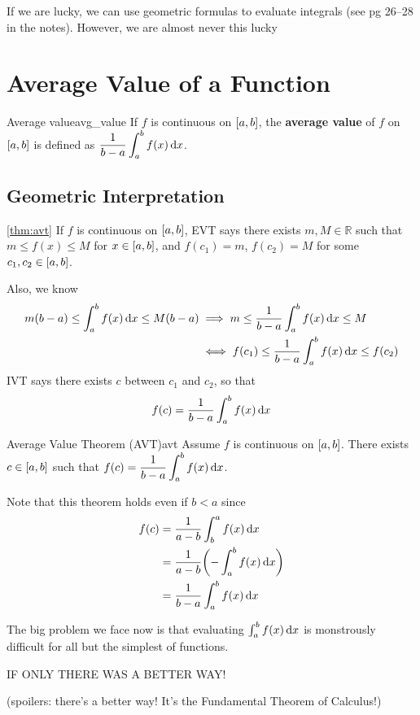 \begin{Remark}{}{}
    If we are lucky, we can use geometric formulas to evaluate integrals
    (see pg 26--28 in the notes). However, we are almost never this lucky\textellipsis{}
\end{Remark}

\section{Average Value of a Function}

\begin{Definition}{Average value}{avg_value}
    If $ f $ is continuous on $ \interval{a}{b} $, the \textbf{average value} of $ f $
    on $ \interval{a}{b} $ is defined as
    $ \displaystyle \frac{1}{b-a} \int_{a}^{b} f(x)\odif{x} $.
\end{Definition}

\subsection*{Geometric Interpretation}
\begin{Proof}{\ref{thm:avt}}{}
    If $ f $ is continuous on $ \interval{a}{b} $, EVT says there exists $ m,M\in\mathbb{R} $ such that
    $ \displaystyle m\le f(x) \le M $
    for $ x\in\interval{a}{b} $, and $ f(c_1)=m $, $ f(c_2)=M $ for some $ c_1,c_2\in\interval{a}{b} $.

    Also, we know
    \begin{align*}
        m(b-a)\le \int_{a}^{b} f(x)\odif{x} \le M(b-a)
         & \implies m\le \frac{1}{b-a} \int_{a}^{b} f(x)\odif{x} \le M       \\
         & \iff f(c_1)\le \frac{1}{b-a} \int_{a}^{b} f(x)\odif{x} \le f(c_2) \\
    \end{align*}
    IVT says there exists $ c $ between $ c_1 $ and $ c_2 $, so that
    \[ f(c)=\frac{1}{b-a} \int_{a}^{b} f(x)\odif{x} \]
\end{Proof}

\begin{Theorem}{Average Value Theorem (AVT)}{avt}
    Assume $ f $ is continuous on $ \interval{a}{b} $.
    There exists $ c\in\interval{a}{b} $ such that
    $ \displaystyle f(c)=\frac{1}{b-a} \int_{a}^{b} f(x)\odif{x} $.
\end{Theorem}

\begin{Remark}{}{}
    Note that this theorem holds even if $ b<a $ since
    \begin{align*}
        f(c) & =\frac{1}{a-b} \int_{b}^{a} f(x)\odif{x}               \\
             & =\frac{1}{a-b}\biggl(-\int_{a}^{b} f(x)\odif{x}\biggr) \\
             & =\frac{1}{b-a} \int_{a}^{b} f(x)\odif{x}
    \end{align*}
\end{Remark}

The big problem we face now is that evaluating $ \int_{a}^{b} f(x)\odif{x} $ is
monstrously difficult for all but the simplest of functions.

IF ONLY THERE WAS A BETTER WAY\@!

(spoilers: there's a better way! It's the Fundamental Theorem of Calculus!)

